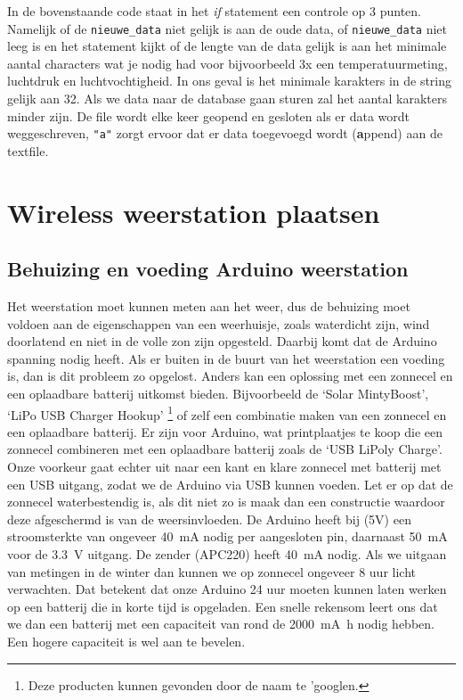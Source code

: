 In de bovenstaande code staat in het \textit{if} statement een controle op 3
punten. Namelijk of de \verb|nieuwe_data| niet gelijk is aan de oude data, of
\verb|nieuwe_data| niet leeg is en het statement kijkt of de lengte van de data
gelijk is aan het minimale aantal characters wat je nodig had voor
bijvoorbeeld 3x een temperatuurmeting, luchtdruk en luchtvochtigheid. In ons geval is 
het minimale karakters in de string gelijk aan 32. Als we data naar de \hisparc database gaan
sturen zal het aantal karakters minder zijn. 
De file wordt elke keer geopend en gesloten als er data wordt weggeschreven, \verb|"a"|
zorgt ervoor dat er data toegevoegd wordt (\textbf{a}ppend) aan de textfile.

\section{Wireless weerstation plaatsen}

\subsection{Behuizing en voeding Arduino weerstation} 
Het weerstation moet kunnen
meten aan het weer, dus de behuizing moet voldoen aan de eigenschappen
van een weerhuisje, zoals waterdicht zijn, wind doorlatend en niet in de
volle zon zijn opgesteld. Daarbij komt dat de Arduino spanning nodig heeft. Als
er buiten in de buurt van het weerstation een voeding is, dan is dit
probleem zo opgelost. Anders kan een oplossing met een zonnecel
en een oplaadbare batterij uitkomst bieden. Bijvoorbeeld de `Solar
MintyBoost', `LiPo USB Charger Hookup' \footnote{Deze producten kunnen
gevonden door de naam te 'googlen.} of zelf een combinatie maken van een
zonnecel en een oplaadbare batterij. Er zijn voor Arduino, wat
printplaatjes te koop die een zonnecel combineren met een oplaadbare
batterij zoals de `USB LiPoly Charge'. Onze voorkeur gaat echter uit
naar een kant en klare zonnecel met batterij met een USB uitgang, zodat we de Arduino
via USB kunnen voeden. Let er op dat de zonnecel waterbestendig is, als dit niet zo is maak dan een
constructie waardoor deze afgeschermd is van de weersinvloeden.
De Arduino heeft bij (5V) een stroomsterkte van ongeveer \SI{40}{\milli\ampere} nodig per 
aangesloten pin, daarnaast \SI{50}{\milli\ampere} voor de \SI{3,3}{\volt} uitgang.
De zender (APC220) heeft \SI{40}{\milli\ampere} nodig.
Als we uitgaan van metingen in de winter dan kunnen we op zonnecel ongeveer
8 uur licht verwachten. Dat betekent dat onze Arduino 24 uur moeten kunnen laten werken
op een batterij die in korte tijd is opgeladen.
Een snelle rekensom leert ons dat we dan een batterij met een capaciteit van rond
de \SI{2000}{\milli\ampere\hour} nodig hebben. Een hogere capaciteit is wel aan te bevelen.

